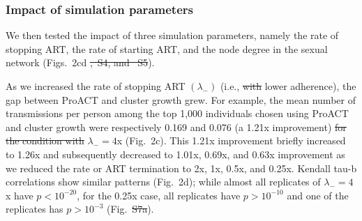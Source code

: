 \documentclass[a4paper,11pt]{article}
\providecommand{\DIFadd}[1]{{\protect\color{blue}\uwave{#1}}} %
\providecommand{\DIFdel}[1]{{\protect\color{red}\sout{#1}}}                      %
\providecommand{\DIFaddbegin}{} %
\providecommand{\DIFaddend}{} %
\providecommand{\DIFdelbegin}{} %
\providecommand{\DIFdelend}{} %
\begin{document}
\subsubsection{Impact of simulation parameters}
We then tested the impact of three simulation parameters, namely the rate of stopping ART, the rate of starting ART, and the node degree in the sexual network (Figs.~2cd \DIFdelbegin \DIFdel{,~S4, and ~S5}\DIFdelend \DIFaddbegin \DIFadd{and S5--S7}\DIFaddend ).

As we increased the rate of stopping ART $\left(\lambda_{-}\right)$ (i.e., \DIFdelbegin \DIFdel{with }\DIFdelend lower adherence), the gap between ProACT and cluster growth grew.
For example, the mean number of transmissions per person among the top 1,000 individuals chosen using ProACT and cluster growth were respectively 0.169 and 0.076 (a 1.21x improvement) \DIFdelbegin \DIFdel{for the condition with }\DIFdelend \DIFaddbegin \DIFadd{when }\DIFaddend $\lambda_-=4$x (Fig.~2c). 
This 1.21x improvement briefly increased to 1.26x and subsequently decreased to 1.01x, 0.69x, and 0.63x improvement as we reduced the rate or ART termination to 2x, 1x, 0.5x, and 0.25x.
Kendall tau-b correlations show similar patterns (Fig.~2d);
while almost all replicates of $\lambda_-=4$x have $p<10^{-20}$, for the 0.25x case, all replicates have $p>10^{-10}$ and one of the replicates has $p>10^{-3}$  (Fig.~\DIFdelbegin \DIFdel{S7a}\DIFdelend \DIFaddbegin \DIFadd{S6}\DIFaddend ).



\end{document}
